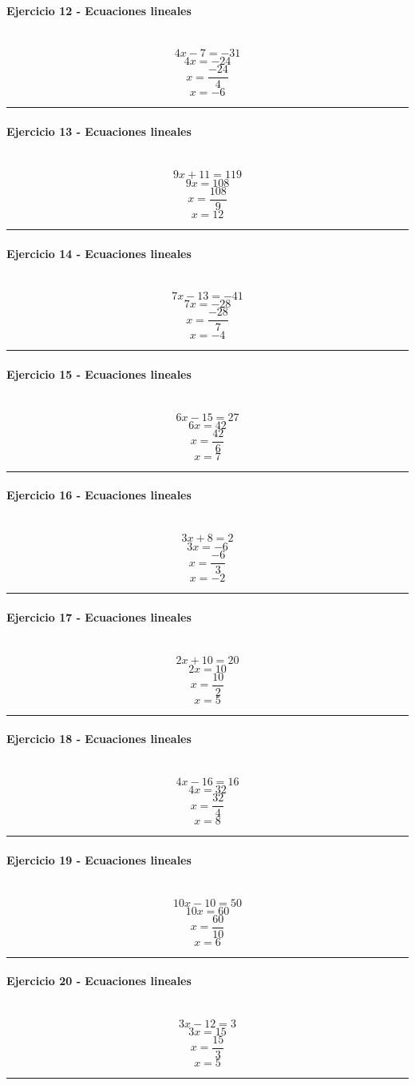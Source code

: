 \documentclass[10pt,a4paper]{article}
\newcommand{\res}[1]{\paragraph{#1}\mbox{}\\[-1.2em]}
\begin{document}
\res{Ejercicio 12 - Ecuaciones lineales}
\[ 4 x - 7=-31 \]
\[ 4x=-24 \]
\[ x=\frac{-24}{4} \]
\[ \boxed{x=-6} \]
\vspace{1mm}\hrule\vspace{2mm}
\res{Ejercicio 13 - Ecuaciones lineales}
\[ 9 x + 11=119 \]
\[ 9x=108 \]
\[ x=\frac{108}{9} \]
\[ \boxed{x=12} \]
\vspace{1mm}\hrule\vspace{2mm}
\res{Ejercicio 14 - Ecuaciones lineales}
\[ 7 x - 13=-41 \]
\[ 7x=-28 \]
\[ x=\frac{-28}{7} \]
\[ \boxed{x=-4} \]
\vspace{1mm}\hrule\vspace{2mm}
\res{Ejercicio 15 - Ecuaciones lineales}
\[ 6 x - 15=27 \]
\[ 6x=42 \]
\[ x=\frac{42}{6} \]
\[ \boxed{x=7} \]
\vspace{1mm}\hrule\vspace{2mm}
\res{Ejercicio 16 - Ecuaciones lineales}
\[ 3 x + 8=2 \]
\[ 3x=-6 \]
\[ x=\frac{-6}{3} \]
\[ \boxed{x=-2} \]
\vspace{1mm}\hrule\vspace{2mm}
\res{Ejercicio 17 - Ecuaciones lineales}
\[ 2 x + 10=20 \]
\[ 2x=10 \]
\[ x=\frac{10}{2} \]
\[ \boxed{x=5} \]
\vspace{1mm}\hrule\vspace{2mm}
\res{Ejercicio 18 - Ecuaciones lineales}
\[ 4 x - 16=16 \]
\[ 4x=32 \]
\[ x=\frac{32}{4} \]
\[ \boxed{x=8} \]
\vspace{1mm}\hrule\vspace{2mm}
\res{Ejercicio 19 - Ecuaciones lineales}
\[ 10 x - 10=50 \]
\[ 10x=60 \]
\[ x=\frac{60}{10} \]
\[ \boxed{x=6} \]
\vspace{1mm}\hrule\vspace{2mm}
\res{Ejercicio 20 - Ecuaciones lineales}
\[ 3 x - 12=3 \]
\[ 3x=15 \]
\[ x=\frac{15}{3} \]
\[ \boxed{x=5} \]
\vspace{1mm}\hrule\vspace{2mm}
\end{document}
